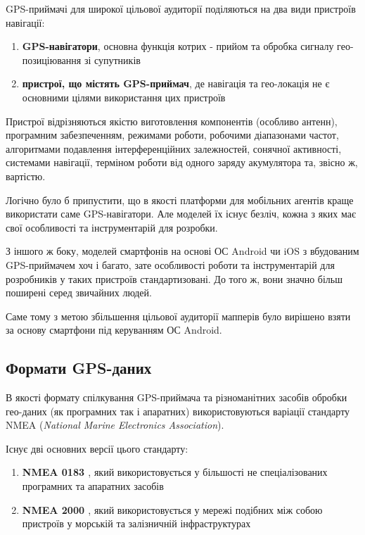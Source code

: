 \documentclass[simple,a4paper,14pt,ukrainian,utf8]{eskdtext}
\begin{document}
    GPS-приймачі для широкої цільової аудиторії поділяються на два види пристроїв навігації:
    
    \begin{enumerate}
    	\item \textbf{GPS-навігатори}, основна функція котрих - прийом та обробка сигналу гео-позиціювання зі супутників
    	\item \textbf{пристрої, що містять GPS-приймач}, де навігація та гео-локація не є основними цілями використання цих пристроїв
    \end{enumerate}
    
    Пристрої відрізняються якістю виготовлення компонентів (особливо антенн), програмним забезпеченням, режимами роботи, робочими діапазонами частот, алгоритмами подавлення інтерференційних залежностей, сонячної активності, системами навігації, терміном роботи від одного заряду акумулятора та, звісно ж, вартістю.

    Логічно було б припустити, що в якості платформи для мобільних агентів краще використати саме GPS-навігатори. Але моделей їх існує безліч, кожна з яких має свої особливості та інструментарій для розробки. 
    
    З іншого ж боку, моделей смартфонів на основі ОС Android чи iOS з вбудованим GPS-приймачем хоч і багато, зате особливості роботи та інструментарій для розробників у таких пристроїв стандартизовані. До того ж, вони значно більш поширені серед звичайних людей.
    
    Саме тому з метою збільшення цільової аудиторії мапперів було вирішено взяти за основу смартфони під керуванням ОС Android.

    \subsection{Формати GPS-даних}
    
    В якості формату спілкування GPS-приймача та різноманітних засобів обробки гео-даних (як програмних так і апаратних) використовуються варіації стандарту NMEA (\textit{National Marine Electronics Association}).
    
    Існує дві основних версії цього стандарту:
    
    \begin{enumerate}
    	\item \textbf{NMEA 0183 \cite{website:nmea_0183}}, який використовується у більшості не спеціалізованих програмних та апаратних засобів
    	\item \textbf{NMEA 2000 \cite{website:nmea_2000}}, який використовується у мережі подібних між собою пристроїв у морській та залізничній інфраструктурах
    \end{enumerate}
    
\end{document}
